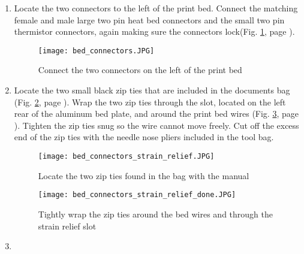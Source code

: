 \begin{enumerate}
\item Locate the two connectors to the left of the print bed. Connect the matching female and male large two pin heat bed connectors and the small two pin thermistor connectors, again making sure the connectors lock(Fig. \ref{fig:bed_connectors}, page \pageref{fig:bed_connectors}).

\begin{figure}[H]
\centering
\texttt{[image: bed\_connectors.JPG]}
\caption{Connect the two connectors on the left of the print bed}
\label{fig:bed_connectors}
\end{figure}

\item Locate the two small black zip ties that are included in the documents bag (Fig. \ref{fig:bed_connectors_strain_relief}, page \pageref{fig:bed_connectors_strain_relief}). Wrap the two zip ties through the slot, located on the left rear of the aluminum bed plate, and around the print bed wires (Fig. \ref{fig:bed_connectors_strain_relief_done}, page \pageref{fig:bed_connectors_strain_relief_done}). Tighten the zip ties snug so the wire cannot move freely. Cut off the excess end of the zip ties with the needle nose pliers included in the tool bag.

\begin{figure}[H]
\centering
\texttt{[image: bed\_connectors\_strain\_relief.JPG]}
\caption{Locate the two zip ties found in the bag with the manual}
\label{fig:bed_connectors_strain_relief}
\end{figure}

\begin{figure}[H]
\centering
\texttt{[image: bed\_connectors\_strain\_relief\_done.JPG]}
\caption{Tightly wrap the zip ties around the bed wires and through the strain relief slot}
\label{fig:bed_connectors_strain_relief_done}
\end{figure}

\item {}


\end{enumerate}
